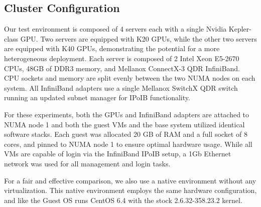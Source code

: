 \documentclass{sigplanconf}
\begin{document}



\subsection{Cluster Configuration}

Our test environment is composed of 4 servers each with a single Nvidia Kepler-class GPU.  Two servers are equipped with K20 GPUs, while the other two servers are equipped with K40 GPUs, demonstrating the potential for a more heterogeneous deployment.  Each server is composed of 2 Intel Xeon E5-2670 CPUs, 48GB of DDR3 memory, and Mellanox ConnectX-3 QDR InfiniBand.  CPU sockets and memory are split evenly between the two NUMA nodes on each system. All InfiniBand adapters use a single Mellanox SwitchX QDR switch running an updated subnet manager for IPoIB functionality.   


For these experiments, both the GPUs and InfiniBand adapters are attached to NUMA node 1 and both the guest VMs and the base system utilized identical software stacks.  Each guest was allocated 20 GB of RAM and a full socket of 8 cores, and pinned to NUMA node 1 to ensure optimal hardware usage. While all VMs are capable of login via the InfiniBand IPoIB setup, a 1Gb Ethernet network was used for all management and login tasks.  


For a fair and effective comparison, we also use a native environment without any virtualization. This native environment employs the same hardware configuration, and like the Guest OS runs CentOS 6.4 with the stock 2.6.32-358.23.2 kernel. 
\end{document}
